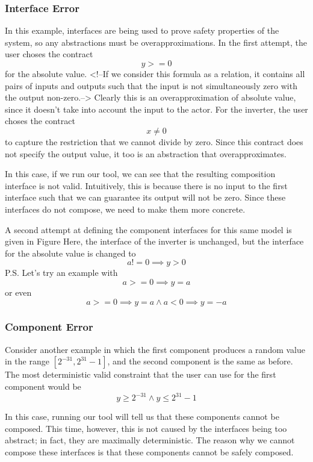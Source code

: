 \documentclass[preprint,11pt,authoryear]{sigplanconf}
\begin{document}
\subsubsection{Interface Error}
In this example, interfaces are being used to prove safety properties of the system, so any abstractions must be overapproximations.  In the first attempt, the user choses the contract
\[
y >= 0
\]
for the absolute value.  <!--If we consider this formula as a relation, it contains all pairs of inputs and outputs such that the input is not simultaneously zero with the output non-zero.-->  Clearly this is an overapproximation of absolute value, since it doesn't take into account the input to the actor.
For the inverter, the user choses the contract
\[
x \ne 0
\]
to capture the restriction that we cannot divide by zero.  Since this contract does not specify the output value, it too is an abstraction that overapproximates.

In this case, if we run our tool, we can see that the resulting composition interface is not valid.  Intuitively, this is because there is no input to the first interface such that we can guarantee its output will not be zero.  Since these interfaces do not compose, we need to make them more concrete.

A second attempt at defining the component interfaces for this same model is given in Figure%
Here, the interface of the inverter is unchanged, but the interface for the absolute value is changed to
\[
a != 0 \implies y > 0
\]
P.S. Let's try an example with \[ a >= 0 \implies y = a\] or even \[a >= 0 \implies y = a  \wedge a < 0 \implies y = -a\]

\subsubsection{Component Error} \label{sec:componentError}
Consider another example in which the first component produces a random value in the range $[2^{-31}, 2^{31}-1]$, and the second component is the same as before.
The most deterministic valid constraint that the user can use for the first component would be
\[
y \ge 2^{-31} \wedge y \le 2^{31}-1
\]

In this case, running our tool will tell us that these components cannot be composed.
This time, however, this is not caused by the interfaces being too abstract; in fact, they are maximally deterministic.
The reason why we cannot compose these interfaces is that these components cannot be safely composed.
\end{document}
